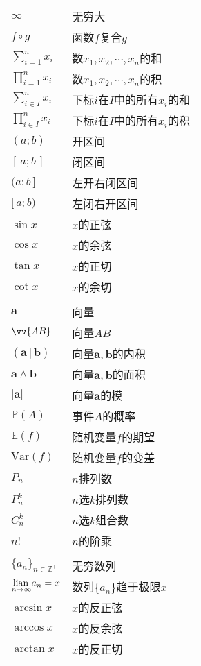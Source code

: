 \documentclass[12pt,UTF8]{article}
\begin{document}
\begin{longtable}{ m{15em} m{15em} }
    $\infty$ & 无穷大 \\
    $f\circ g$ & 函数$f$复合$g$ \\
    $\displaystyle\sum_{i=1}^n x_i$ & 数$x_1, x_2, \cdots, x_n$的和 \\
    $\displaystyle\prod_{i=1}^n x_i$ & 数$x_1, x_2, \cdots, x_n$的积 \\
    $\displaystyle\sum_{i\in I}^n x_i$ & 下标$i$在$I$中的所有$x_i$的和 \\
    $\displaystyle\prod_{i\in I}^n x_i$ & 下标$i$在$I$中的所有$x_i$的积 \\
    $(a;b)$ & 开区间 \\
    $[\,a;b\,]$ & 闭区间 \\
    $(a;b\,]$ & 左开右闭区间 \\
    $[\,a;b)$ & 左闭右开区间 \\
    $\sin{x}$ & $x$的正弦 \\
    $\cos{x}$ & $x$的余弦 \\
    $\tan{x}$ & $x$的正切 \\
    $\cot{x}$ & $x$的余切 \\
    & \\
    $\mathbf{a}$ & 向量 \\
    $\vv{AB}$ & 向量$AB$\\
    $(\mathbf{a}\, | \, \mathbf{b})$ & 向量$\mathbf{a},\mathbf{b}$的内积 \\
    $\mathbf{a}\wedge \mathbf{b}$ & 向量$\mathbf{a},\mathbf{b}$的面积 \\
    $|\mathbf{a}|$ & 向量$\mathbf{a}$的模 \\
    $\mathbb{P}(A)$ & 事件$A$的概率 \\
    $\mathbb{E}(f)$ & 随机变量$f$的期望 \\
    $\mathrm{Var}(f)$ & 随机变量$f$的变差 \\
    $P_n$ & $n$排列数 \\
    $P_n^k$ & $n$选$k$排列数 \\
    $C_n^k$ & $n$选$k$组合数 \\
    $n!$ & $n$的阶乘 \\
    & \\
    $\displaystyle\{a_n\}_{n\in\mathbb{Z}^+}$ & 无穷数列 \\
    $\underset{n\to \infty}{\operatorname{lian}\,} a_n = x$ & 数列$\{a_n\}$趋于极限$x$ \\
    $\arcsin{x}$ & $x$的反正弦 \\
    $\arccos{x}$ & $x$的反余弦 \\
    $\arctan{x}$ & $x$的反正切 \\

\end{longtable}
\end{document}
